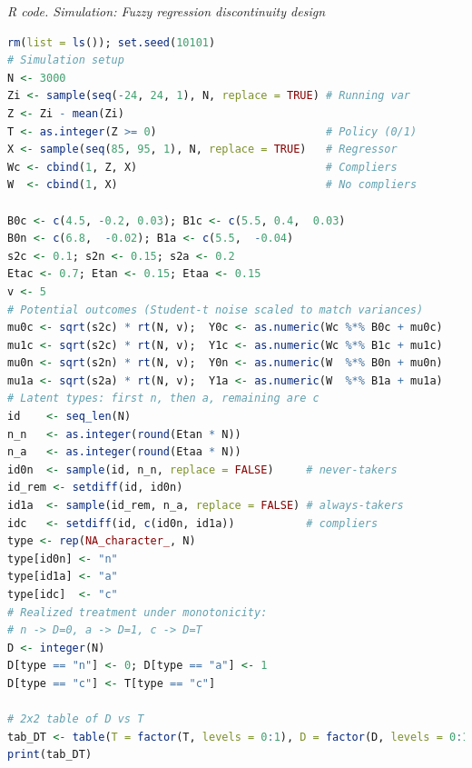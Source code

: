 \begin{tcolorbox}[enhanced,width=4.67in,center upper,
	fontupper=\large\bfseries,drop shadow southwest,sharp corners]
	\textit{R code. Simulation: Fuzzy regression discontinuity design}
	\begin{VF}
		\begin{lstlisting}[language=R]		
rm(list = ls()); set.seed(10101)
# Simulation setup
N <- 3000
Zi <- sample(seq(-24, 24, 1), N, replace = TRUE) # Running var
Z <- Zi - mean(Zi)
T <- as.integer(Z >= 0)                          # Policy (0/1)
X <- sample(seq(85, 95, 1), N, replace = TRUE)   # Regressor
Wc <- cbind(1, Z, X)                             # Compliers
W  <- cbind(1, X)                                # No compliers

B0c <- c(4.5, -0.2, 0.03); B1c <- c(5.5, 0.4,  0.03)
B0n <- c(6.8,  -0.02); B1a <- c(5.5,  -0.04)
s2c <- 0.1; s2n <- 0.15; s2a <- 0.2
Etac <- 0.7; Etan <- 0.15; Etaa <- 0.15
v <- 5
# Potential outcomes (Student-t noise scaled to match variances)
mu0c <- sqrt(s2c) * rt(N, v);  Y0c <- as.numeric(Wc %*% B0c + mu0c)
mu1c <- sqrt(s2c) * rt(N, v);  Y1c <- as.numeric(Wc %*% B1c + mu1c)
mu0n <- sqrt(s2n) * rt(N, v);  Y0n <- as.numeric(W  %*% B0n + mu0n)
mu1a <- sqrt(s2a) * rt(N, v);  Y1a <- as.numeric(W  %*% B1a + mu1a)
# Latent types: first n, then a, remaining are c
id    <- seq_len(N)
n_n   <- as.integer(round(Etan * N))
n_a   <- as.integer(round(Etaa * N))
id0n  <- sample(id, n_n, replace = FALSE)     # never-takers
id_rem <- setdiff(id, id0n)
id1a  <- sample(id_rem, n_a, replace = FALSE) # always-takers
idc   <- setdiff(id, c(id0n, id1a))           # compliers
type <- rep(NA_character_, N)
type[id0n] <- "n"
type[id1a] <- "a"
type[idc]  <- "c"
# Realized treatment under monotonicity:
# n -> D=0, a -> D=1, c -> D=T
D <- integer(N)
D[type == "n"] <- 0; D[type == "a"] <- 1
D[type == "c"] <- T[type == "c"]

# 2x2 table of D vs T
tab_DT <- table(T = factor(T, levels = 0:1), D = factor(D, levels = 0:1))
print(tab_DT)
		\end{lstlisting}
	\end{VF}
\end{tcolorbox}  

